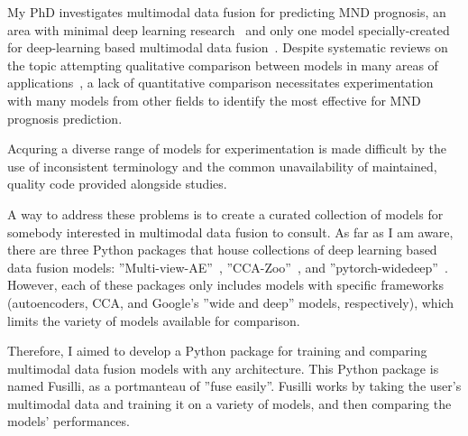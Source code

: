 My PhD investigates multimodal data fusion for predicting MND prognosis, an area with minimal deep learning research~\cite{pancottiDeepLearningMethods2022, mullerExplainableModelsDisease2021} and only one model specially-created for deep-learning based multimodal data fusion~\cite{vanderburghDeepLearningPredictions2017}.
Despite systematic reviews on the topic attempting qualitative comparison between models in many areas of applications~\cite{cuiDeepMultimodalFusion2022, gaoSurveyDeepLearning2020, stahlschmidtMultimodalDeepLearning2022, yanDeepMultiviewLearning2021}, a lack of quantitative comparison necessitates experimentation with many models from other fields to identify the most effective for MND prognosis prediction.

Acquring a diverse range of models for experimentation is made difficult by the use of inconsistent terminology and the common unavailability of maintained, quality code provided alongside studies.

A way to address these problems is to create a curated collection of models for somebody interested in multimodal data fusion to consult.
As far as I am aware, there are three Python packages that house collections of deep learning based data fusion models: ''Multi-view-AE''~\cite{aguilaMultiviewAEPythonPackage2023}, ''CCA-Zoo''~\cite{chapmanCCAZooCollectionRegularized2021}, and ''pytorch-widedeep''~\cite{zaurinPytorchwidedeepFlexiblePackage2023}.
However, each of these packages only includes models with specific frameworks (autoencoders, CCA, and Google's ''wide and deep'' models, respectively), which limits the variety of models available for comparison.

Therefore, I aimed to develop a Python package for training and comparing multimodal data fusion models with any architecture.
This Python package is named Fusilli, as a portmanteau of ''fuse easily''.
Fusilli works by taking the user's multimodal data and training it on a variety of models, and then comparing the models' performances.

